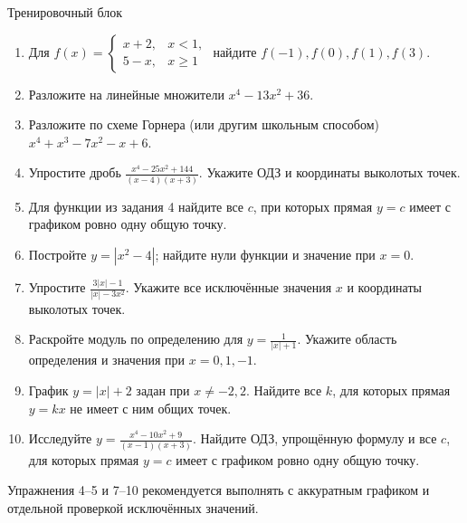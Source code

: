 \documentclass[a4paper,12pt]{article}
\begin{document}
\clearpage
\begin{center}{\LARGE\color{darkaccent}Тренировочный блок}\par\vspace{2mm}{\small Путь А. 10 заданий от базовых к более содержательным.}\end{center}
\vspace{6mm}
\begin{enumerate}
\item Для \(f(x)=\begin{cases}x+2,&x<1,\\5-x,&x\ge1\end{cases}\) найдите \(f(-1), f(0), f(1), f(3)\).
\item Разложите на линейные множители \(x^4-13x^2+36\).
\item Разложите по схеме Горнера (или другим школьным способом) \(x^4+x^3-7x^2-x+6\).
\item Упростите дробь \(\displaystyle\frac{x^4-25x^2+144}{(x-4)(x+3)}\). Укажите ОДЗ и координаты выколотых точек.
\item Для функции из задания 4 найдите все \(c\), при которых прямая \(y=c\) имеет с графиком ровно одну общую точку.
\item Постройте \(y=|x^2-4|\); найдите нули функции и значение при \(x=0\).
\item Упростите \(\displaystyle\frac{3|x|-1}{|x|-3x^2}\). Укажите все исключённые значения \(x\) и координаты выколотых точек.
\item Раскройте модуль по определению для \(\displaystyle y=\frac1{|x|+1}\). Укажите область определения и значения при \(x=0,1,-1\).
\item График \(y=|x|+2\) задан при \(x\ne-2,2\). Найдите все \(k\), для которых прямая \(y=kx\) не имеет с ним общих точек.
\item Исследуйте \(\displaystyle y=\frac{x^4-10x^2+9}{(x-1)(x+3)}\). Найдите ОДЗ, упрощённую формулу и все \(c\), для которых прямая \(y=c\) имеет с графиком ровно одну общую точку.
\end{enumerate}

\vfill
\textcolor{textgray}{\small Упражнения 4--5 и 7--10 рекомендуется выполнять с аккуратным графиком и отдельной проверкой исключённых значений.}
\end{document}
